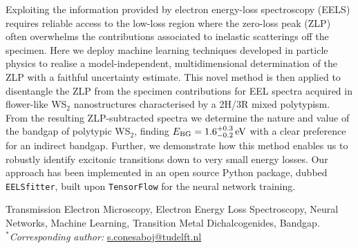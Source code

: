 \documentclass[12pt,a4paper]{article}
\numberwithin{equation}{section}
\numberwithin{figure}{section}
\numberwithin{table}{section}
\begin{document}
Exploiting the information provided by electron energy-loss spectroscopy  (EELS)
requires reliable access to the
low-loss region 
where the zero-loss peak (ZLP) often overwhelms
the contributions associated to inelastic scatterings off the specimen.
%
Here we deploy machine learning techniques developed in particle physics
to realise a model-independent, multidimensional determination of the ZLP
with a faithful uncertainty estimate.
%
This novel method 
is then applied to disentangle the ZLP from the
specimen contributions for EEL spectra acquired in 
flower-like WS$_2$
nanostructures characterised by  a 2H/3R mixed polytypism.
%
From the resulting ZLP-subtracted spectra we
determine the nature and value of the bandgap of polytypic WS$_2$,
finding  $E_{\rm BG} = 1.6_{-0.2}^{+0.3}\,{\rm eV}$ with a clear preference for
an indirect bandgap.
%
Further, we demonstrate how this method enables us to robustly identify excitonic
transitions down to very small energy losses.
%
Our approach has been implemented in an
open source {\sc Python} package, dubbed {\tt EELSfitter}, built upon
{\tt TensorFlow} for the neural network training.

\vspace{0.4cm}
 {\small Transmission Electron Microscopy,
Electron Energy Loss Spectroscopy, Neural Networks, Machine Learning, Transition
Metal Dichalcogenides, Bandgap.}\\

\noindent
{\it $^{*}$Corresponding author:} \href{mailto:s.conesaboj@tudelft.nl}{s.conesaboj@tudelft.nl}

\clearpage
\tableofcontents








%



\appendix

\end{document}
